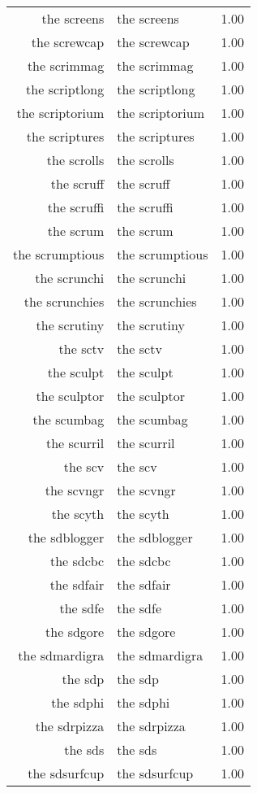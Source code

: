 \begin{table}[ht]
\begin{tabular}{rlr}
  the screens & the screens & 1.00 \\ 
  the screwcap & the screwcap & 1.00 \\ 
  the scrimmag & the scrimmag & 1.00 \\ 
  the scriptlong & the scriptlong & 1.00 \\ 
  the scriptorium & the scriptorium & 1.00 \\ 
  the scriptures & the scriptures & 1.00 \\ 
  the scrolls & the scrolls & 1.00 \\ 
  the scruff & the scruff & 1.00 \\ 
  the scruffi & the scruffi & 1.00 \\ 
  the scrum & the scrum & 1.00 \\ 
  the scrumptious & the scrumptious & 1.00 \\ 
  the scrunchi & the scrunchi & 1.00 \\ 
  the scrunchies & the scrunchies & 1.00 \\ 
  the scrutiny & the scrutiny & 1.00 \\ 
  the sctv & the sctv & 1.00 \\ 
  the sculpt & the sculpt & 1.00 \\ 
  the sculptor & the sculptor & 1.00 \\ 
  the scumbag & the scumbag & 1.00 \\ 
  the scurril & the scurril & 1.00 \\ 
  the scv & the scv & 1.00 \\ 
  the scvngr & the scvngr & 1.00 \\ 
  the scyth & the scyth & 1.00 \\ 
  the sdblogger & the sdblogger & 1.00 \\ 
  the sdcbc & the sdcbc & 1.00 \\ 
  the sdfair & the sdfair & 1.00 \\ 
  the sdfe & the sdfe & 1.00 \\ 
  the sdgore & the sdgore & 1.00 \\ 
  the sdmardigra & the sdmardigra & 1.00 \\ 
  the sdp & the sdp & 1.00 \\ 
  the sdphi & the sdphi & 1.00 \\ 
  the sdrpizza & the sdrpizza & 1.00 \\ 
  the sds & the sds & 1.00 \\ 
  the sdsurfcup & the sdsurfcup & 1.00 \\ 

\end{tabular}
\end{table}
